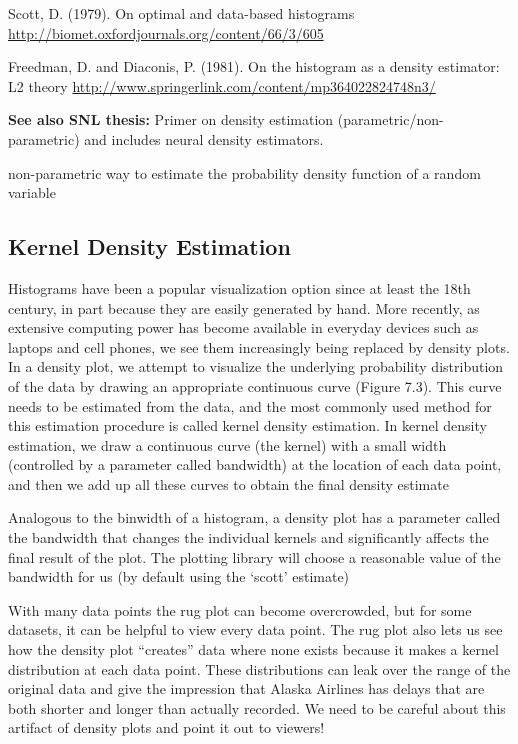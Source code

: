 Scott, D. (1979). On optimal and data-based histograms \url{http://biomet.oxfordjournals.org/content/66/3/605}

Freedman, D. and Diaconis, P. (1981). On the histogram as a density estimator: L2 theory \url{http://www.springerlink.com/content/mp364022824748n3/}

\textbf{See also SNL thesis:} Primer on density estimation (parametric/non-parametric) and includes neural density estimators. 


non-parametric way to estimate the probability density function of a random variable

\subsection{Kernel Density Estimation}

Histograms have been a popular visualization option since at least the 18th century, in part because they are easily generated by hand. More recently, as extensive computing power has become available in everyday devices such as laptops and cell phones, we see them increasingly being replaced by density plots. In a density plot, we attempt to visualize the underlying probability distribution of the data by drawing an appropriate continuous curve (Figure 7.3). This curve needs to be estimated from the data, and the most commonly used method for this estimation procedure is called kernel density estimation. In kernel density estimation, we draw a continuous curve (the kernel) with a small width (controlled by a parameter called bandwidth) at the location of each data point, and then we add up all these curves to obtain the final density estimate

Analogous to the binwidth of a histogram, a density plot has a parameter called the bandwidth that changes the individual kernels and significantly affects the final result of the plot. The plotting library will choose a reasonable value of the bandwidth for us (by default using the ‘scott’ estimate)

With many data points the rug plot can become overcrowded, but for some datasets, it can be helpful to view every data point. The rug plot also lets us see how the density plot “creates” data where none exists because it makes a kernel distribution at each data point. These distributions can leak over the range of the original data and give the impression that Alaska Airlines has delays that are both shorter and longer than actually recorded. We need to be careful about this artifact of density plots and point it out to viewers!

